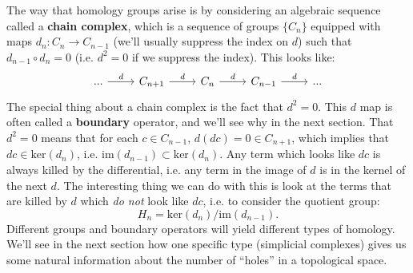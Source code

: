 \documentclass[12pt, oneside]{article}   	%
\theoremstyle{definition}
\begin{document}
The way that homology groups arise is by considering an algebraic sequence called a \textbf{chain complex}, which is a sequence of groups $\{C_n\}$ equipped with maps $d_n : C_n \rightarrow C_{n - 1}$ (we'll usually suppress the index on $d$) such that $d_{n - 1}\circ d_n = 0$ (i.e. $d^2 = 0$ if we suppress the index). This looks like:
\begin{equation}\begin{tikzcd}
		...\arrow[r, "d"] & C_{n + 1}\arrow[r, "d"] & C_n\arrow[r, "d"] & C_{n - 1}\arrow[r, "d"] & ...
\end{tikzcd}\end{equation}
The special thing about a chain complex is the fact that $d^2 = 0$. This $d$ map is often called a \textbf{boundary} operator, and we'll see why in the next section. That $d^2 = 0$ means that for each $c\in C_{n - 1}$, $d (dc) = 0\in C_{n + 1}$, which implies that $dc\in \mathrm{ker}(d_n)$, i.e. $\mathrm{im}(d_{n - 1})\subset \mathrm{ker}(d_n)$. Any term which looks like $dc$ is always killed by the differential, i.e. any term in the image of $d$ is in the kernel of the next $d$. The interesting thing we can do with this is look at the terms that are killed by $d$ which \textit{do not} look like $dc$, i.e. to consider the quotient group:
\begin{equation}
	H_n = \mathrm{ker}(d_n) / \mathrm{im}(d_{n - 1}). \label{eq:homology_group_dfn}
\end{equation}
Different groups and boundary operators will yield different types of homology. We'll see in the next section how one specific type (simplicial complexes) gives us some natural information about the number of ``holes'' in a topological space. 
\end{document}
